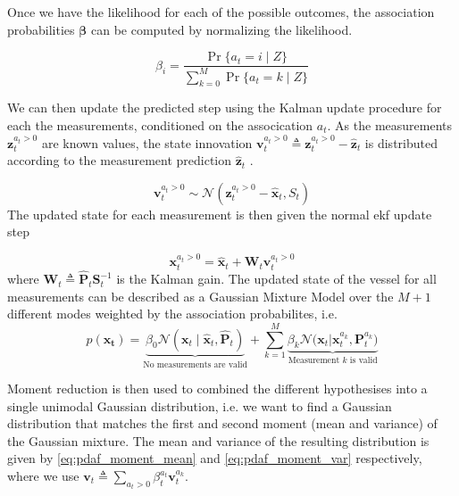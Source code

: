 Once we have the likelihood for each of the possible outcomes, the association probabilities $\boldsymbol{\beta}$ can be computed by normalizing the likelihood.

\begin{equation}
    \beta_i = \frac{\Pr\{a_t=i \; | \; Z\}}{\sum_{k=0}^M \Pr\{a_t=k \; | \; Z\}}
\end{equation}

We can then update the predicted step using the Kalman update procedure for each the measurements, conditioned on the assocication $a_t$. As the measurements $\boldsymbol{z}_t^{a_t > 0}$ are known values, the state innovation $\boldsymbol{v}_t^{a_t>0} \triangleq \boldsymbol{z}_t^{a_t>0} - \hat{\boldsymbol{z}}_t$ is distributed according to the measurement prediction $\hat{\boldsymbol{z}}_t$ . 

\begin{equation}
    \boldsymbol{v}_t^{a_t>0} \sim \mathcal{N}(\boldsymbol{z}_t^{a_t>0} - \hat{\boldsymbol{x}}_t, S_t)
\end{equation}
The updated state for each measurement is then given the normal \acrshort{ekf} update step

\begin{equation}
    \boldsymbol{x}_t^{a_t > 0} = \hat{\boldsymbol{x}}_t + \boldsymbol{W}_t \boldsymbol{v}_t^{a_t > 0}
\end{equation} where $\boldsymbol{W}_t \triangleq \hat{\boldsymbol{P}}_t \boldsymbol{S}_t^{-1}$ is the Kalman gain. 
 The updated state of the vessel for all measurements can be described as a Gaussian Mixture Model over the $M+1$ different modes weighted by the association probabilites, i.e.
\begin{equation}
    p(\boldsymbol{x_t}) = \underbrace{\beta_0 \mathcal{N}(\boldsymbol{x}_t \; | \; \hat{\boldsymbol{x}}_t, \hat{\boldsymbol{P}}_t)}_{\text{No measurements are valid}} + \sum_{k=1}^M \underbrace{\beta_k \mathcal{N}\big(\boldsymbol{x}_t | \boldsymbol{x}_t^{a_k}, \boldsymbol{P}_t^{a_k}\big)}_{\text{Measurement $k$ is valid}}
\end{equation}


Moment reduction is then used to combined the different hypothesises into a single unimodal Gaussian distribution, i.e. we want to find a Gaussian distribution that matches the first and second moment (mean and variance) of the Gaussian mixture. The mean and variance of the resulting distribution is given by \cref{eq:pdaf_moment_mean} and \cref{eq:pdaf_moment_var} respectively, where we use $\boldsymbol{v}_t \triangleq \sum_{a_t > 0} \beta_t^{a_t} \boldsymbol{v}_t^{a_k}$.

